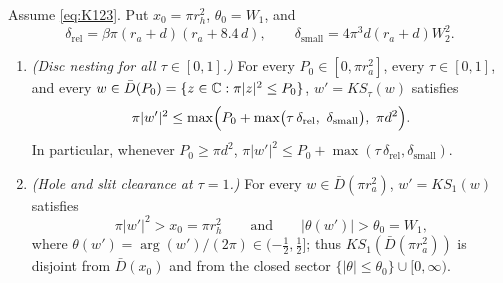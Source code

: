 \begin{theorem}\label{thm:kh-bounds}
Assume \eqref{eq:K123}. Put $x_0=\pi r_h^2$, $\theta_0=W_1$, and
\[
 \delta_{\mathrm{rel}} = \beta\pi(r_a+d)(r_a+8.4\,d),\qquad
 \delta_{\mathrm{small}} = 4\pi^3 d(r_a+d)W_2^2.
\]
\begin{enumerate}[label=(\roman*)]
\item \emph{(Disc nesting for all $\tau\in[0,1]$.)} For every $P_0\in[0,\pi r_a^2]$, every $\tau\in[0,1]$, and every
$w\in\bar D(P_0)=\{z\in\mathbb{C}:\pi|z|^2\le P_0\}$, $w'=KS_\tau(w)$ satisfies
\begin{equation}\label{eq:kh-nest}
 \pi|w'|^2 \le \max\Bigl(P_0 + \max\bigl(\tau\,\delta_{\mathrm{rel}},\ \delta_{\mathrm{small}}\bigr),\ \pi d^2\Bigr).
\end{equation}
In particular, whenever $P_0\ge\pi d^2$, $\pi|w'|^2\le P_0+\max(\tau\,\delta_{\mathrm{rel}},\delta_{\mathrm{small}})$.
\item \emph{(Hole and slit clearance at $\tau=1$.)} For every $w\in\bar D(\pi r_a^2)$, $w'=KS_1(w)$ satisfies
\[
 \pi|w'|^2 > x_0=\pi r_h^2 \qquad\text{and}\qquad |\theta(w')| > \theta_0=W_1,
\]
where $\theta(w')=\arg(w')/(2\pi)\in(-\frac12,\frac12]$; thus $KS_1(\bar D(\pi r_a^2))$ is disjoint from $\bar D(x_0)$
and from the closed sector $\{|\theta|\le\theta_0\}\cup[0,\infty)$.
\end{enumerate}
\end{theorem}

